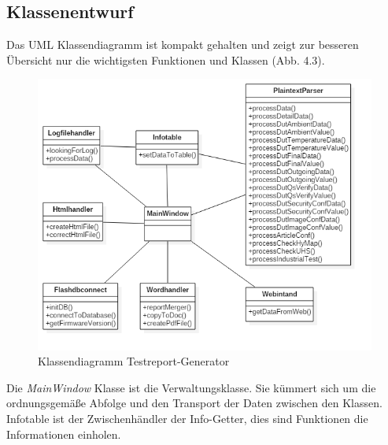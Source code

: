 \subsection{Klassenentwurf}
Das \ac{UML} Klassendiagramm ist kompakt gehalten und zeigt zur besseren Übersicht nur die wichtigsten Funktionen und Klassen (Abb. 4.3).
\begin{figure}[H]
\centering
\includegraphics[scale=0.7]{images/uml_terege}
\caption{Klassendiagramm Testreport-Generator}
\label{fig:Klassendiagramm Testreport-Generator}
\end{figure}
Die \textit{MainWindow} Klasse ist die Verwaltungsklasse. Sie kümmert sich um die ordnungsgemäße Abfolge und den Transport der Daten zwischen den Klassen. Infotable ist der Zwischenhändler der Info-Getter, dies sind Funktionen die Informationen einholen.

